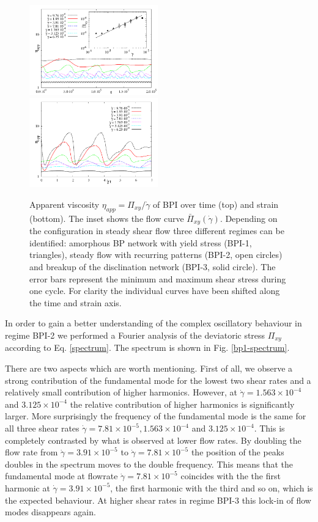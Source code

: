 \documentclass[aps,pre,reprint,superscriptaddress, twocolumn]{revtex4}
\newcommand{\e}[1]{\times10^{#1}}
\newcommand{\gd}{\dot{\gamma}}
\begin{document}
\begin{figure}[htpb]
\includegraphics[width=0.495\textwidth]{stress_bp1.pdf}
\includegraphics[width=0.495\textwidth]{stress_vs_strain_bp1.pdf}
\caption{Apparent viscosity $\eta_{app}=\Pi_{xy}/\dot{\gamma}$ of BPI over time (top) 
and strain (bottom). The inset shows the flow curve $\bar{\Pi}_{xy}(\gd)$. 
Depending on the configuration in steady shear flow three different regimes 
can be identified: amorphous BP network with yield stress (BPI-1, triangles), 
steady flow with recurring patterns (BPI-2, open circles) and 
breakup of the disclination network (BPI-3, solid circle). 
The error bars represent the minimum and maximum shear stress 
during one cycle. For clarity the individual curves have been shifted along
the time and strain axis.}
\label{bp1-rheo}
\end{figure}

In order to gain a better understanding of the complex oscillatory behaviour in regime BPI-2 
we performed a Fourier analysis of the deviatoric stress $\Pi_{xy}$ according to Eq. \ref{spectrum}. 
The spectrum is shown in Fig. \ref{bp1-spectrum}. 

There are two aspects which are worth mentioning. First of all, we observe a strong contribution of 
the fundamental mode for the lowest two shear rates and a relatively small contribution of higher harmonics. 
However, at $\gd=1.563\e{-4}$ and $3.125\e{-4}$ the relative contribution of higher harmonics is 
significantly larger. 
More surprisingly the frequency of the fundamental mode is the same 
for all three shear rates $\gd=7.81\e{-5}, 1.563\e{-4}$ and $3.125\e{-4}$. This is completely 
contrasted by what is observed at lower flow rates. By doubling the flow rate from 
$\gd=3.91\e{-5}$ to $\gd=7.81\e{-5}$ the position of the peaks doubles in the spectrum 
moves to the double frequency. This means that the fundamental mode at flowrate $\gd=7.81\e{-5}$ 
coincides with the the first harmonic at $\gd=3.91\e{-5}$, the first harmonic with the third and so on,
which is the expected behaviour. At higher shear rates in regime BPI-3 this lock-in of 
flow modes disappears again.  
 
\end{document}
